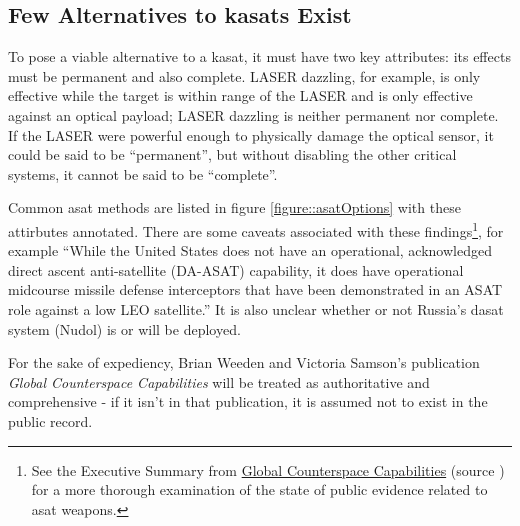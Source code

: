 \subsection{Few Alternatives to \acp{kasat} Exist}

To pose a viable alternative to a \ac{kasat}, it must have two key
attributes: its effects must be permanent and also complete.  LASER
dazzling, for example, is only effective while the target is within
range of the LASER and is only effective against an optical payload;
LASER dazzling is neither permanent nor complete.  If the LASER were
powerful enough to physically damage the optical sensor, it could be
said to be ``permanent'', but without disabling the other critical
systems, it cannot be said to be ``complete''.

Common \ac{asat} methods are listed in figure
\ref{figure::asatOptions} with these attirbutes annotated.  There are
some caveats associated with these findings\footnote{See the Executive
Summary from
\href{https://swfound.org/media/207344/swf_global_counterspace_capabilities_2022.pdf}{Global
  Counterspace Capabilities} (source \cite{brian}) for a more thorough
examination of the state of public evidence related to \acl{asat}
weapons.}, for example ``While the United States does not have an
operational, acknowledged direct ascent anti-satellite (DA-ASAT)
capability, it does have operational midcourse missile defense
interceptors that have been demonstrated in an ASAT role against a low
LEO satellite.''\cite[pxiii]{brian} It is also unclear whether or not
Russia's \ac{dasat} system (Nudol) is or will be
deployed.\cite[pxv]{brian}

For the sake of expediency, Brian Weeden and Victoria Samson's
publication {\it Global Counterspace Capabilities}\cite{brian} will be
treated as authoritative and comprehensive - if it isn't in that
publication, it is assumed not to exist in the public record.

